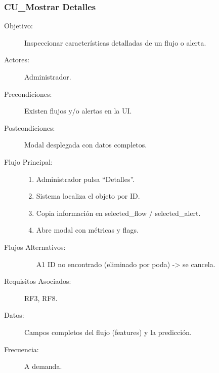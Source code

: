 \subsubsection{CU\_Mostrar Detalles}
\begin{description}
  \item[Objetivo:] Inspeccionar características detalladas de un flujo o alerta.
  \item[Actores:] Administrador.
  \item[Precondiciones:] Existen flujos y/o alertas en la UI.
  \item[Postcondiciones:] Modal desplegada con datos completos.
  \item[Flujo Principal:]
    \begin{enumerate}
      \item Administrador pulsa “Detalles”.
      \item Sistema localiza el objeto por ID.
      \item Copia información en selected\_flow / selected\_alert.
      \item Abre modal con métricas y flags.
    \end{enumerate}
  \item[Flujos Alternativos:]
    \begin{enumerate}
      \item[A1] ID no encontrado (eliminado por poda) -> se cancela.
    \end{enumerate}
  \item[Requisitos Asociados:] RF3, RF8.
  \item[Datos:] Campos completos del flujo (features) y la predicción.
  \item[Frecuencia:] A demanda.
\end{description}

